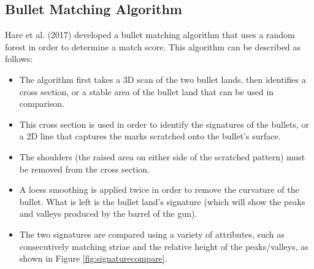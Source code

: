 \documentclass[print]{nuthesis}
\begin{document}
\hypertarget{bullet-matching-algorithm}{%
\subsection{Bullet Matching Algorithm}\label{bullet-matching-algorithm}}

Hare et al. (2017) developed a bullet matching algorithm that uses a random forest in order to determine a match score.
This algorithm can be described as follows:

\begin{itemize}
\item
  The algorithm first takes a 3D scan of the two bullet lands, then identifies a cross section, or a stable area of the bullet land that can be used in comparison.
\item
  This cross section is used in order to identify the signatures of the bullets, or a 2D line that captures the marks scratched onto the bullet's surface.
\item
  The shoulders (the raised area on either side of the scratched pattern) must be removed from the cross section.
\item
  A loess smoothing is applied twice in order to remove the curvature of the bullet.
  What is left is the bullet land's signature (which will show the peaks and valleys produced by the barrel of the gun).
\item
  The two signatures are compared using a variety of attributes, such as consecutively matching striae and the relative height of the peaks/valleys, as shown in Figure \ref{fig:signaturecompare}.
\end{itemize}
\end{document}
